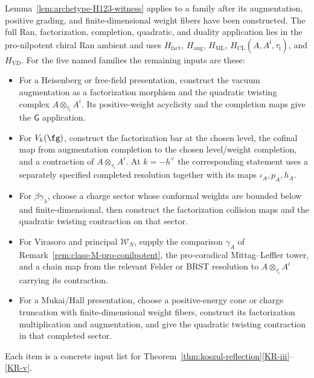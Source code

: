 \begin{remark}
\label{rem:five-archetype-K-squared}
%
Lemma~\ref{lem:archetype-H123-witness} applies to a family after its
augmentation, positive grading, and finite-dimensional weight fibers
have been constructed.  The full Ran, factorization, completion,
quadratic, and duality application lies in the pro-nilpotent chiral
Ran ambient and uses $H_{\mathrm{fact}}$, $H_{\mathrm{aug}}$, $H_{\mathrm{ML}}$,
$H_{\mathrm{CL}}(A,A^{\mathrm i},\tau_{\mathrm i})$, and $H_{\mathrm{VD}}$.
For the five named families the remaining inputs are these:
\begin{itemize}
\item[$\mathsf G$.]  For a Heisenberg or free-field presentation,
construct the vacuum augmentation as a factorization morphism and the
quadratic twisting complex
$A\otimes_{\tau_{\mathrm i}}A^i$.  Its positive-weight acyclicity and the
completion maps give the $\mathsf G$ application.
\item[$\mathsf L$.]  For $V_k(\fg)$, construct the factorization bar at
the chosen level, the cofinal map from augmentation completion to the
chosen level/weight completion, and a contraction of
$A\otimes_{\tau_{\mathrm i}}A^i$.  At $k=-h^\vee$ the corresponding statement
uses a separately specified completed resolution together with its
maps $\iota_A,p_A,h_A$.
\item[$\mathsf C$.]  For $\beta\gamma_\lambda$, choose a charge sector
whose conformal weights are bounded below and finite-dimensional,
then construct the factorization collision maps and the quadratic
twisting contraction on that sector.
\item[$\mathsf M$.]  For Virasoro and principal $\mathcal W_N$, supply
the comparison $\gamma_A$ of
Remark~\ref{rem:class-M-pro-conilpotent}, the pro-coradical
Mittag--Leffler tower, and a chain map from the relevant Felder or BRST
resolution to $A\otimes_{\tau_{\mathrm i}}A^i$ carrying its contraction.
\item[$\mathsf B$.]  For a Mukai/Hall presentation, choose a
positive-energy cone or charge truncation with finite-dimensional
weight fibers, construct its factorization multiplication and
augmentation, and give the quadratic twisting contraction in that
completed sector.
\end{itemize}
Each item is a concrete input list for
Theorem~\ref{thm:koszul-reflection}\ref{KR-iii}--\ref{KR-v}.
\end{remark}

